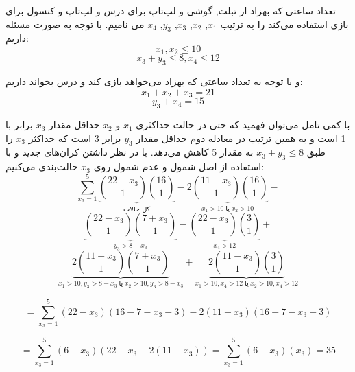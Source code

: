     \p
	تعداد ساعتی که بهزاد از تبلت, گوشی و لپ‌تاپ برای درس و لپ‌تاپ و کنسول برای بازی استفاده می‌کند را به ترتیب $x_1$, $x_2$, $x_3$, $y_3$, $x_4$ می نامیم.
    با توجه به صورت مسئله داریم:
    $$x_1, x_2 \leq 10$$
    $$x_3 + y_3 \leq 8 , x_4 \leq 12$$
    
    \p
    و با توجه به تعداد ساعتی که بهزاد می‌خواهد بازی کند و درس بخواند داریم:
    $$x_1 + x_2 + x_3 = 21$$
    $$y_3 + x_4 = 15$$
    
    \p
    با کمی تامل می‌توان فهمید که حتی در حالت حداکثری $x_1$ و $x_2$ حداقل مقدار $x_3$ برابر با 1 است و به همین ترتیب در معادله دوم حداقل مقدار $y_3$ برابر 3 است که حداکثر $x_3$ را طبق $x_3 + y_3 \leq 8$ به مقدار 5 کاهش می‌دهد. با در نظر داشتن کران‌های جدید و با استفاده از اصل شمول و عدم شمول روی $x_3$ حالت‌بندی می‌کنیم:
    $$\sum\limits_{x_3 = 1}^5 \underbrace{{22 - x_3 \choose 1}{16 \choose 1}}_{\text{کل حالات}} - \underbrace{2{11 - x_3 \choose 1}{16 \choose 1}}_{x_1 > 10 \; \text{یا} \; x_2 > 10} - $$
    $$\underbrace{{22 - x_3 \choose 1}{7 + x_3 \choose 1}}_{y_3 > 8 - x_3} - \underbrace{{22 - x_3 \choose 1}{3 \choose 1}}_{x_4 > 12} + $$
    $$\underbrace{2{11 - x_3 \choose 1}{7 + x_3 \choose 1}}_{x_1 > 10, y_3 > 8 - x_3 \; \text{یا} \; x_2 > 10, y_3 > 8 - x_3} + \underbrace{2{11 - x_3 \choose 1}{3 \choose 1}}_{x_1 > 10, x_4 > 12 \; \text{یا} \; x_2 > 10, x_4 > 12}$$
    
    $$= \sum\limits_{x_3 = 1}^5 (22 - x_3)(16 - 7 - x_3 - 3) - 2(11 - x_3)(16 - 7 - x_3 - 3)$$
    
    $$= \sum\limits_{x_3 = 1}^5 (6 - x_3)(22 - x_3 - 2(11 - x_3)) = \sum\limits_{x_3 = 1}^5 (6 - x_3)(x_3) = 35$$
